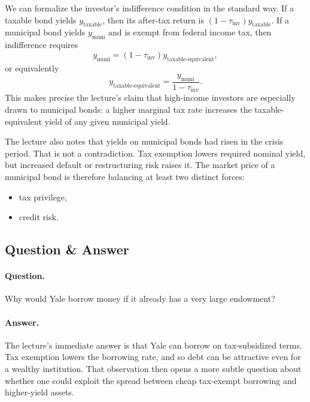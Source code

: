 We can formalize the investor's indifference condition in the standard way. If a taxable bond yields \(y_{\text{taxable}}\), then its after-tax return is \((1-\tau_{\text{inv}})y_{\text{taxable}}\). If a municipal bond yields \(y_{\text{muni}}\) and is exempt from federal income tax, then indifference requires
\begin{equation}
y_{\text{muni}}=(1-\tau_{\text{inv}})y_{\text{taxable-equivalent}},
\end{equation}
or equivalently
\begin{equation}
y_{\text{taxable-equivalent}}=\frac{y_{\text{muni}}}{1-\tau_{\text{inv}}}.
\end{equation}
This makes precise the lecture's claim that high-income investors are especially drawn to municipal bonds: a higher marginal tax rate increases the taxable-equivalent yield of any given municipal yield.

The lecture also notes that yields on municipal bonds had risen in the crisis period. That is not a contradiction. Tax exemption lowers required nominal yield, but increased default or restructuring risk raises it. The market price of a municipal bond is therefore balancing at least two distinct forces:
\begin{itemize}
\item tax privilege,
\item credit risk.
\end{itemize}

\subsection{Question \& Answer}

\paragraph{Question.} Why would Yale borrow money if it already has a very large endowment?

\paragraph{Answer.} The lecture's immediate answer is that Yale can borrow on tax-subsidized terms. Tax exemption lowers the borrowing rate, and so debt can be attractive even for a wealthy institution. That observation then opens a more subtle question about whether one could exploit the spread between cheap tax-exempt borrowing and higher-yield assets.

